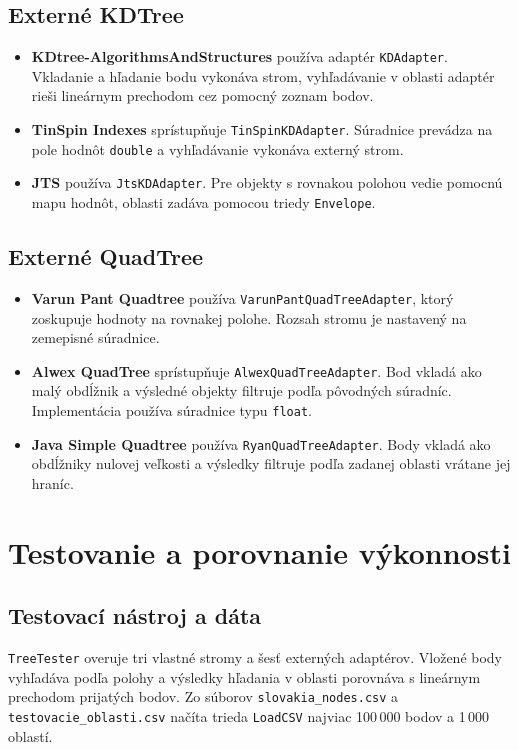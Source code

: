 \documentclass[12pt,a4paper,oneside]{report}
\begin{document}
\section{Externé KDTree}
\begin{itemize}[leftmargin=1.5em]
\item \textbf{KDtree-AlgorithmsAndStructures} \cite{externalKd} používa
  adaptér \texttt{KDAdapter}. Vkladanie a hľadanie bodu vykonáva strom,
  vyhľadávanie v oblasti adaptér rieši lineárnym prechodom cez pomocný
  zoznam bodov.
\item \textbf{TinSpin Indexes} \cite{tinspin} sprístupňuje
  \texttt{TinSpinKDAdapter}. Súradnice prevádza na pole hodnôt
  \texttt{double} a vyhľadávanie vykonáva externý strom.
\item \textbf{JTS} \cite{jts} používa \texttt{JtsKDAdapter}.
  Pre objekty s rovnakou polohou vedie pomocnú mapu hodnôt, oblasti
  zadáva pomocou triedy \texttt{Envelope}.
\end{itemize}

\section{Externé QuadTree}
\begin{itemize}[leftmargin=1.5em]
\item \textbf{Varun Pant Quadtree} \cite{varunQuad} používa
  \texttt{VarunPantQuadTreeAdapter}, ktorý zoskupuje hodnoty na rovnakej
  polohe. Rozsah stromu je nastavený na zemepisné súradnice.
\item \textbf{Alwex QuadTree} \cite{alwexQuad} sprístupňuje
  \texttt{AlwexQuadTreeAdapter}. Bod vkladá ako malý obdĺžnik a výsledné
  objekty filtruje podľa pôvodných súradníc. Implementácia používa
  súradnice typu \texttt{float}.
\item \textbf{Java Simple Quadtree} \cite{ryanQuad} používa
  \texttt{RyanQuadTreeAdapter}. Body vkladá ako obdĺžniky nulovej veľkosti
  a výsledky filtruje podľa zadanej oblasti vrátane jej hraníc.
\end{itemize}

\chapter{Testovanie a porovnanie výkonnosti}
\label{chap:testing}

\section{Testovací nástroj a dáta}
\texttt{TreeTester} overuje tri vlastné stromy a šesť externých adaptérov.
Vložené body vyhľadáva podľa polohy a výsledky hľadania v oblasti
porovnáva s lineárnym prechodom prijatých bodov. Zo súborov
\texttt{slovakia\_nodes.csv} a \texttt{testovacie\_oblasti.csv}
načíta trieda \texttt{LoadCSV} najviac 100\,000 bodov a 1\,000 oblastí.
\end{document}
